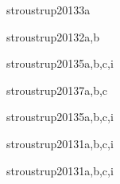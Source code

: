 \begin{syllabus}
\begin{unit}{\ALFundamentalAlgorithmsDef}{}{stroustrup2013}{3}{a}
    \ALFundamentalAlgorithmsAllTopics
    \ALFundamentalAlgorithmsAllObjectives
\end{unit}

\begin{unit}{\PLDeclarationsAndTypesDef}{}{stroustrup2013}{2}{a,b}
    \PLDeclarationsAndTypesAllTopics
    \PLDeclarationsAndTypesAllObjectives
\end{unit}

\begin{unit}{\PLAbstractionMechanismsDef}{}{stroustrup2013}{5}{a,b,c,i}
    \PLAbstractionMechanismsAllTopics
    \PLAbstractionMechanismsAllTopics
\end{unit}

\begin{unit}{\PLObjectOrientedProgrammingDef}{}{stroustrup2013}{7}{a,b,c}
    \PLObjectOrientedProgrammingAllTopics
    \PLObjectOrientedProgrammingAllObjectives
\end{unit}

\begin{unit}{\SESoftwareDesignDef}{}{stroustrup2013}{5}{a,b,c,i}
   \begin{topics}
	\item \SESoftwareDesignTopicFundamental%
	\item \SESoftwareDesignTopicTherole%
	\item \SESoftwareDesignTopicDesignPatterns%
   \end{topics}
   \begin{learningoutcomes}
      \item \SESoftwareDesignObjONE
      \item \SESoftwareDesignObjFIVE
   \end{learningoutcomes}
\end{unit}

\begin{unit}{\SEUsingAPIsDef}{}{stroustrup2013}{1}{a,b,c,i}
   \SEUsingAPIsAllTopics
   \SEUsingAPIsAllObjectives
\end{unit}

\begin{unit}{\SERequirementsSpecificationsDef}{}{stroustrup2013}{1}{a,b,c,i}
   \begin{topics}
   	\item \SERequirementsSpecificationsTopicRequeriments
	\item \SERequirementsSpecificationsTopicPrototyping
	\item \SERequirementsSpecificationsTopicBasic
   \end{topics}
   \begin{learningoutcomes}
   	\item \SERequirementsSpecificationsObjTWO
	\item \SERequirementsSpecificationsObjTHREE
	\item \SERequirementsSpecificationsObjFIVE
   \end{learningoutcomes}
\end{unit}

\begin{coursebibliography}
\end{coursebibliography}

\end{syllabus}

%
